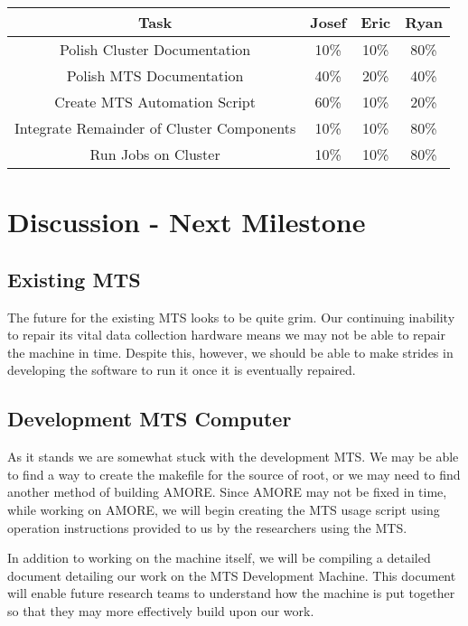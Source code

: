 \documentclass[12pt]{article}
\newcommand\tab[1][1cm]{\hspace*{#1}}
\begin{document}
\begin{center}
  \begin{tabular}{|c|c|c|c|}
    \hline
    Task & Josef & Eric & Ryan \\
    \hline
    Polish Cluster Documentation & 10\% & 10\% & 80\% \\
    Polish MTS Documentation & 40\% & 20\% & 40\% \\
    Create MTS Automation Script & 60\% & 10\% & 20\% \\
    Integrate Remainder of Cluster Components & 10\% & 10\% & 80\% \\
    Run Jobs on Cluster & 10\% & 10\% & 80\% \\
    \hline
  \end{tabular}
\end{center}

\section{Discussion - Next Milestone}

\subsection{Existing MTS}

\tab The future for the existing MTS looks to be quite grim. Our continuing
inability to repair its vital data collection hardware means we may not be able
to repair the machine in time. Despite this, however, we should be able to make
strides in developing the software to run it once it is eventually repaired.

\subsection{Development MTS Computer}

\tab As it stands we are somewhat stuck with the development MTS. We may be able
to find a way to create the makefile for the source of root, or we may need to
find another method of building AMORE. Since AMORE may not be fixed in time,
while working on AMORE, we will begin creating the MTS usage script using
operation instructions provided to us by the researchers using the MTS.

\tab In addition to working on the machine itself, we will be compiling a
detailed document detailing our work on the MTS Development Machine. This
document will enable future research teams to understand how the machine is put
together so that they may more effectively build upon our work.
\end{document}
